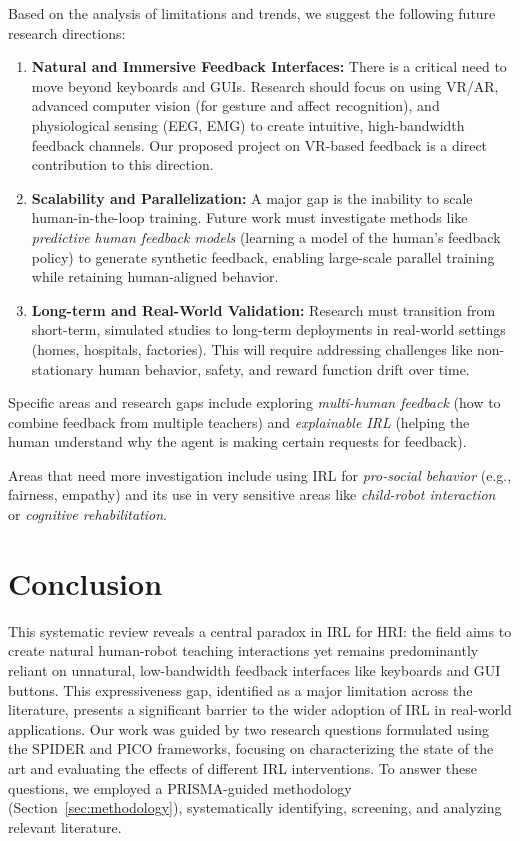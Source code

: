 \documentclass[rnd]{mas_proposal}
\begin{document}
Based on the analysis of limitations and trends, we suggest the following future research directions:
\begin{enumerate}
    \item \textbf{Natural and Immersive Feedback Interfaces:} There is a critical need to move beyond keyboards and GUIs. Research should focus on using VR/AR, advanced computer vision (for gesture and affect recognition), and physiological sensing (EEG, EMG) to create intuitive, high-bandwidth feedback channels. Our proposed project on VR-based feedback is a direct contribution to this direction.
    \item \textbf{Scalability and Parallelization:} A major gap is the inability to scale human-in-the-loop training. Future work must investigate methods like \textit{predictive human feedback models} (learning a model of the human's feedback policy) to generate synthetic feedback, enabling large-scale parallel training while retaining human-aligned behavior.
    \item \textbf{Long-term and Real-World Validation:} Research must transition from short-term, simulated studies to long-term deployments in real-world settings (homes, hospitals, factories). This will require addressing challenges like non-stationary human behavior, safety, and reward function drift over time.
\end{enumerate}

Specific areas and research gaps include exploring \textit{multi-human feedback} (how to combine feedback from multiple teachers) and \textit{explainable IRL} (helping the human understand why the agent is making certain requests for feedback).

Areas that need more investigation include using IRL for \textit{pro-social behavior} (e.g., fairness, empathy) and its use in very sensitive areas like \textit{child-robot interaction} or \textit{cognitive rehabilitation}.

\section{Conclusion}
\label{sec:conclusion}

This systematic review reveals a central paradox in IRL for HRI: the field aims to create natural human-robot teaching interactions yet remains predominantly reliant on unnatural, low-bandwidth feedback interfaces like keyboards and GUI buttons. This expressiveness gap, identified as a major limitation across the literature, presents a significant barrier to the wider adoption of IRL in real-world applications. Our work was guided by two research questions formulated using the SPIDER and PICO frameworks, focusing on characterizing the state of the art and evaluating the effects of different IRL interventions. To answer these questions, we employed a PRISMA-guided methodology (Section~\ref{sec:methodology}), systematically identifying, screening, and analyzing relevant literature.
\end{document}
